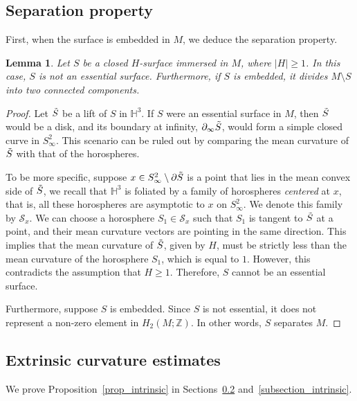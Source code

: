 \documentclass[12pt,a4paper]{amsart}
\numberwithin{equation}{section}
\theoremstyle{plain}
\newtheorem{Lemma}[Th]{Lemma}
\theoremstyle{named}
\theoremstyle{definition}
\begin{document}
\subsection{Separation property}

First, when the surface is embedded in $M$, we deduce the separation property.
\begin{Lemma}\label{lem_separating}
    Let $S$ be a closed $H$-surface immersed in $M$, where $|H|\geq 1$. In this case, $S$ is not an essential surface. Furthermore, if $S$ is embedded, it divides $M\setminus S$ into two connected components.
\end{Lemma}
\begin{proof}

    Let $\Tilde{S}$ be a lift of $S$ in $\mathbb{H}^3$. If $S$ were an essential surface in $M$, then $\Tilde{S}$ would be a disk, and its boundary at infinity, $\partial_\infty\Tilde{S}$, would form a simple closed curve in $S^2_\infty$. This scenario can be ruled out by comparing the mean curvature of $\Tilde{S}$ with that of the horospheres. 
    
    To be more specific, suppose $x\in S^{2}_\infty\setminus \partial\Tilde{S}$ is a point that lies in the mean convex side of $\Tilde{S}$, we recall that $\mathbb{H}^3$ is foliated by a family of horospheres \emph{centered} at $x$, that is, all these horospheres are asymptotic to $x$ on $S^{2}_\infty$. We denote this family by $\mathcal{S}_{x}$. 
    We can choose a horosphere $S_1\in\mathcal{S}_x$ such that $S_1$ is tangent to $\Tilde{S}$ at a point, and their mean curvature vectors are pointing in the same direction. This implies that the mean curvature of $\Tilde{S}$, given by $H$, must be strictly less than the mean curvature of the horosphere $S_1$, which is equal to $1$. However, this contradicts the assumption that $H\geq 1$. Therefore, $S$ cannot be an essential surface.

    Furthermore, suppose $S$ is embedded. Since $S$ is not essential, it does not represent a non-zero element in $H_2(M;\mathbb{Z})$. In other words, $S$ separates $M$.
\end{proof}




\subsection{Extrinsic curvature estimates}\label{subsection_extrinsic}
We prove Proposition~\ref{prop_intrinsic} in Sections~\ref{subsection_extrinsic} and~\ref{subsection_intrinsic}.
\end{document}
